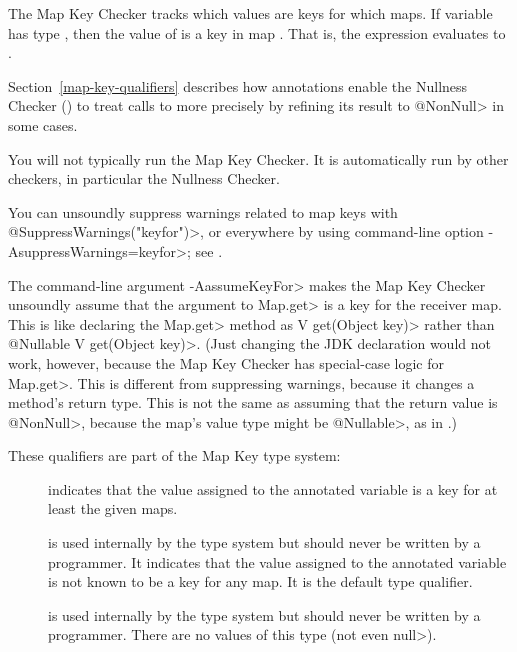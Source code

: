 
The Map Key Checker tracks which values are keys for which maps.  If variable
 has type , then the value of  is a key
in map .  That is, the expression  evaluates to
.

Section~\ref{map-key-qualifiers} describes how  annotations
enable the
Nullness Checker () to treat calls to
more precisely by refining its result to \<@NonNull> in some cases.



You will not typically run the Map Key Checker.  It is automatically run by
other checkers, in particular the Nullness Checker.

You can unsoundly suppress warnings related to map keys with
\<@SuppressWarnings("keyfor")>, or everywhere by using command-line option
\<-AsuppressWarnings=keyfor>; see .

The command-line argument \<-AassumeKeyFor> makes the Map Key Checker
unsoundly assume that the argument to \<Map.get> is a key for the receiver
map.  This is like declaring the \<Map.get> method as \<V get(Object key)>
rather than \<@Nullable V get(Object key)>.  (Just changing the JDK
declaration would not work, however, because the Map Key Checker has
special-case logic for \<Map.get>.  This is different from suppressing
warnings, because it changes a method's return type.  This is not the same
as assuming that the return value is \<@NonNull>, because the map's value
type might be \<@Nullable>, as in .)



These qualifiers are part of the Map Key type system:

\begin{description}

\item[]
  indicates that the value assigned to the annotated variable is a key for at
  least the given maps.

\item[]
  is used internally by the type system but should never be written by a
  programmer.  It indicates that the value assigned to the annotated
  variable is not known to be a key for any map.  It is the default type
  qualifier.

\item[]
  is used internally by the type system but should never be written by a
  programmer.  There are no values of this type (not even \<null>).

\end{description}

